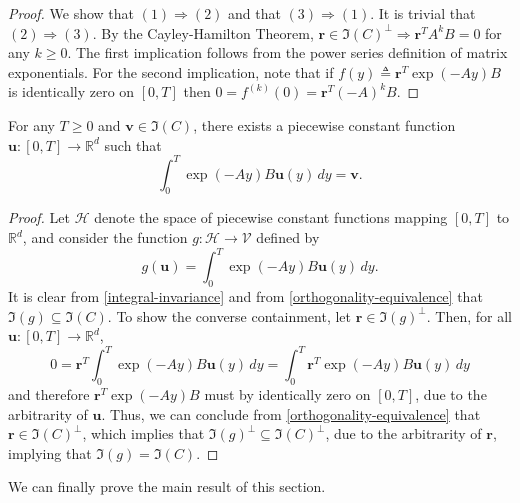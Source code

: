 \begin{proof}
We show that $(1) \Rightarrow (2)$ and that $(3) \Rightarrow (1)$. It is trivial that $(2) \Rightarrow (3)$.
By the Cayley-Hamilton Theorem, $\boldsymbol{r} \in \Im(C)^{\perp} \Rightarrow \boldsymbol{r}^{T} A^{k} B = 0$ for any $k \geq 0$. The first implication follows from the power series definition of matrix exponentials. For the second implication, note that if $f(y) \triangleq \boldsymbol{r}^{T} \exp(-Ay) B$ is identically zero on $[0,T]$ then $0 = f^{(k)} (0) = \boldsymbol{r}^{T} (-A)^{k} B$.
\end{proof}

\begin{proposition}
For any $T \geq 0$ and $\boldsymbol{v} \in \Im(C)$, there exists a piecewise constant function $\boldsymbol{u} : [0, T] \rightarrow \mathbb{R}^{d}$ such that
\begin{equation}
\label{control-existence}
\int_{0}^{T} \exp(-Ay) B \boldsymbol{u}(y) \, dy = \boldsymbol{v}.
\end{equation}
\end{proposition}

\begin{proof}
Let $\mathcal{H}$ denote the space of piecewise constant functions mapping $[0,T]$ to $\mathbb{R}^{d}$, and consider the function $g : \mathcal{H} \rightarrow \mathcal{V}$ defined by
\begin{equation*}
g(\boldsymbol{u}) = \int_{0}^{T} \exp(-Ay) B \boldsymbol{u}(y) \, dy.
\end{equation*}
It is clear from \cref{integral-invariance} and from \cref{orthogonality-equivalence} that $\Im(g) \subseteq \Im(C)$. To show the converse containment, let $\boldsymbol{r} \in \Im(g)^{\perp}$. Then, for all $\boldsymbol{u} : [0,T] \rightarrow \mathbb{R}^{d}$,
\begin{equation*}
0 = \boldsymbol{r}^{T} \int_{0}^{T} \exp(-Ay) B \boldsymbol{u}(y) \, dy = \int_{0}^{T} \boldsymbol{r}^{T} \exp(-Ay) B \boldsymbol{u}(y) \, dy
\end{equation*}
and therefore $\boldsymbol{r}^{T} \exp(-Ay) B$ must by identically zero on $[0,T]$, due to the arbitrarity of $\boldsymbol{u}$. Thus, we can conclude from \cref{orthogonality-equivalence} that $\boldsymbol{r} \in \Im(C)^{\perp}$, which implies that $\Im(g)^{\perp} \subseteq \Im(C)^{\perp}$, due to the arbitrarity of $\boldsymbol{r}$, implying that $\Im(g) = \Im(C)$.
\end{proof}

We can finally prove the main result of this section.

